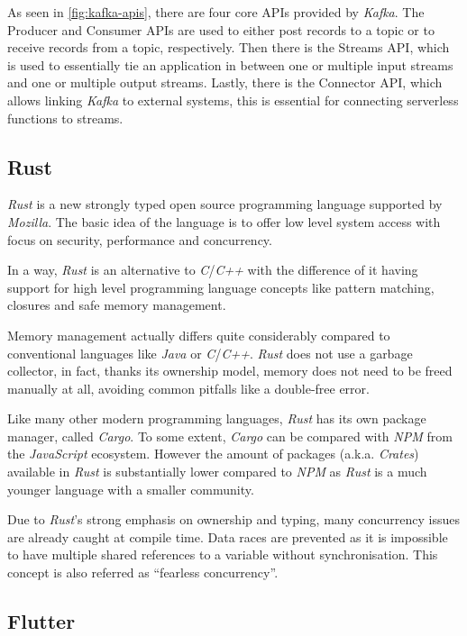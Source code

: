 As seen in \autoref{fig:kafka-apis}, there are four core APIs provided by \textit{Kafka}. The
Producer and Consumer APIs are used to either post records to a topic or to receive records from a
topic, respectively. Then there is the Streams API, which is used to essentially tie an application
in between one or multiple input streams and one or multiple output streams. Lastly, there is the
Connector API, which allows linking \textit{Kafka} to external systems, this is essential for
connecting serverless functions to streams.
\cite{kafka-introduction}

\subsection{Rust}

\textit{Rust} is a new strongly typed open source programming language supported by
\textit{Mozilla}. The basic idea of the language is to offer low level system access with focus on
security, performance and concurrency. \cite{rustbook1, forkjoin}

In a way, \textit{Rust} is an alternative to \textit{C}/\textit{C++} with the difference of it
having support for high level programming language concepts like pattern matching, closures and safe
memory management. \cite{rustbook1, forkjoin}

Memory management actually differs quite considerably compared to conventional languages like
\textit{Java} or \textit{C}/\textit{C++}. \textit{Rust} does not use a garbage collector, in fact,
thanks its ownership model, memory does not need to be freed manually at all, avoiding common
pitfalls like a double-free error.

Like many other modern programming languages, \textit{Rust} has its own package manager, called
\textit{Cargo}. To some extent, \textit{Cargo} can be compared with \textit{NPM} from the
\textit{JavaScript} ecosystem. However the amount of packages (a.k.a. \textit{Crates}) available in
\textit{Rust} is substantially lower compared to \textit{NPM} as \textit{Rust} is a much younger
language with a smaller community.

Due to \textit{Rust}'s strong emphasis on ownership and typing, many concurrency issues are already
caught at compile time. Data races are prevented as it is impossible to have multiple shared
references to a variable without synchronisation. This concept is also referred as “fearless
concurrency”. \cite{rustbook2}

\subsection{Flutter}


